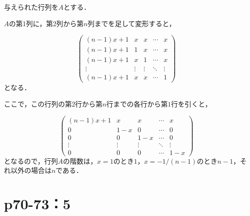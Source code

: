 \documentclass[a4paper,10pt,fleqn]{ltjsarticle}
\begin{document}
\begin{leftbar}
    与えられた行列を$A$とする．

    $A$の第1列に，第2列から第$n$列までを足して変形すると，

    \[
        \begin{pmatrix}
            (n-1)x+1 & x      & x      & \cdots & x      \\
            (n-1)x+1 & 1      & x      & \cdots & x      \\
            (n-1)x+1 & x      & 1      & \cdots & x      \\
            \vdots   & \vdots & \vdots & \ddots & \vdots \\
            (n-1)x+1 & x      & x      & \cdots & 1
        \end{pmatrix}
    \]
    となる．

    ここで，この行列の第$2$行から第$n$行までの各行から第$1$行を引くと，

    \[
        \begin{pmatrix}
            (n-1)x+1 & x      & x      & \cdots & x      \\
            0        & 1-x    & 0      & \cdots & 0      \\
            0        & 0      & 1-x    & \cdots & 0      \\
            \vdots   & \vdots & \vdots & \ddots & \vdots \\
            0        & 0      & 0      & \cdots & 1 -x
        \end{pmatrix}
    \]
    となるので，行列$A$の階数は，$x=1$のとき$1$，$ x= -1/(n-1)$のとき$n-1$，それ以外の場合は$n$である．
\end{leftbar}


\newpage

\section*{p70-73：5}
\end{document}
